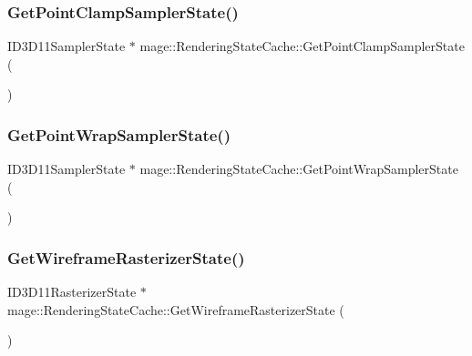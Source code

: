 \hypertarget{structmage_1_1_rendering_state_cache_aabf172b1363478d2570a242303e38838}{}\label{structmage_1_1_rendering_state_cache_aabf172b1363478d2570a242303e38838} 
\subsubsection{\texorpdfstring{Get\+Point\+Clamp\+Sampler\+State()}{GetPointClampSamplerState()}}
{\footnotesize\ttfamily I\+D3\+D11\+Sampler\+State $\ast$ mage\+::\+Rendering\+State\+Cache\+::\+Get\+Point\+Clamp\+Sampler\+State (\begin{DoxyParamCaption}{ }\end{DoxyParamCaption})}

\hypertarget{structmage_1_1_rendering_state_cache_a4d1b6eef773700e3fb80195f93b484f9}{}\label{structmage_1_1_rendering_state_cache_a4d1b6eef773700e3fb80195f93b484f9} 
\subsubsection{\texorpdfstring{Get\+Point\+Wrap\+Sampler\+State()}{GetPointWrapSamplerState()}}
{\footnotesize\ttfamily I\+D3\+D11\+Sampler\+State $\ast$ mage\+::\+Rendering\+State\+Cache\+::\+Get\+Point\+Wrap\+Sampler\+State (\begin{DoxyParamCaption}{ }\end{DoxyParamCaption})}

\hypertarget{structmage_1_1_rendering_state_cache_a86d51235df703c952a1e50d95eae4244}{}\label{structmage_1_1_rendering_state_cache_a86d51235df703c952a1e50d95eae4244} 
\subsubsection{\texorpdfstring{Get\+Wireframe\+Rasterizer\+State()}{GetWireframeRasterizerState()}}
{\footnotesize\ttfamily I\+D3\+D11\+Rasterizer\+State $\ast$ mage\+::\+Rendering\+State\+Cache\+::\+Get\+Wireframe\+Rasterizer\+State (\begin{DoxyParamCaption}{ }\end{DoxyParamCaption})}


